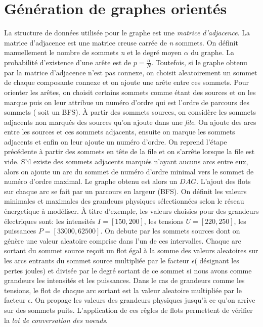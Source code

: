 \documentclass[onecolumn, 12pt]{book}
\begin{document}
\section{G\'en\'eration de graphes orient\'es}
La structure de donn\'ees utilis\'ee pour le graphe est une {\em matrice d'adjacence}.
La matrice d'adjacence est une matrice creuse carr\'ee de {\em n} sommets.
On d\'efinit manuellement le nombre de sommets {\em n} et le degr\'e moyen  $\alpha$ du graphe. 
La probabilit\'e d'existence d'une ar\^ete est de $p = \frac{\alpha}{N}$.
Toutefois, si le graphe obtenu par la matrice d'adjacence n'est pas connexe, on choisit aleatoirement un sommet de chaque composante connexe et on ajoute une ar\^ete entre ces sommets.
\newline
Pour orienter les ar\^etes, on choisit certains sommets comme \'etant des sources et on les marque puis on leur attribue un  num\'ero d'ordre qui est l'ordre de parcours des sommets ( soit un BFS).
\`A partir des sommets sources, on consid\`ere les sommets adjacents non marqu\'es des sources qu'on ajoute dans une {\em file}. On ajoute des arcs entre les sources et ces sommets adjacents, ensuite on marque les sommets adjacents et enfin on leur ajoute un num\'ero d'ordre. On reprend l'\'etape pr\'ec\'edente \`a partir des sommets en t\^ete de la file et on s'arr\^ete lorsque la file est vide.
S'il existe des sommets adjacents marqu\'es n'ayant aucuns arcs entre eux, alors on ajoute un arc du sommet de num\'ero d'ordre minimal vers le sommet de num\'ero d'ordre maximal.
Le graphe obtenu est alors un $DAG$.
\newline
L'ajout des flots sur chaque arc se fait par un parcours en largeur (BFS).
On d\'efinit les valeurs minimales et maximales des grandeurs physiques s\'electionn\'ees selon le r\'eseau \'energetique \`a mod\'eliser. \`A titre d'exemple, les valeurs choisies pour des grandeurs \'electriques sont: les intensit\'es $I = [150, 200 ]$, les tensions $U = [220, 250]$, les puissances $P = [ 33000, 62500]$. \newline
On debute par les sommets sources dont on g\'en\`ere une valeur aleatoire comprise dans l'un de ces intervalles. 
Chaque arc sortant du sommet source re\c coit  un flot \'egal \`a la somme des valeurs aleatoires sur les arcs entrants du sommet source multipli\'ee par le facteur $\epsilon$( d\'esignant les pertes joules) et divis\'ee par le degr\'e sortant de ce sommet si nous avons comme grandeurs les intensit\'es et les puissances.
Dans le cas de grandeurs comme les tensions, le flot de chaque arc sortant est la valeur aleatoire multipli\'ee par le facteur $\epsilon$. 
On propage les valeurs des grandeurs physiques jusqu'\`a ce qu'on arrive sur des sommets puits.
L'application de ces r\^egles de flots permettent de v\'erifier la {\em loi de conversation des noeuds}.
\end{document}
